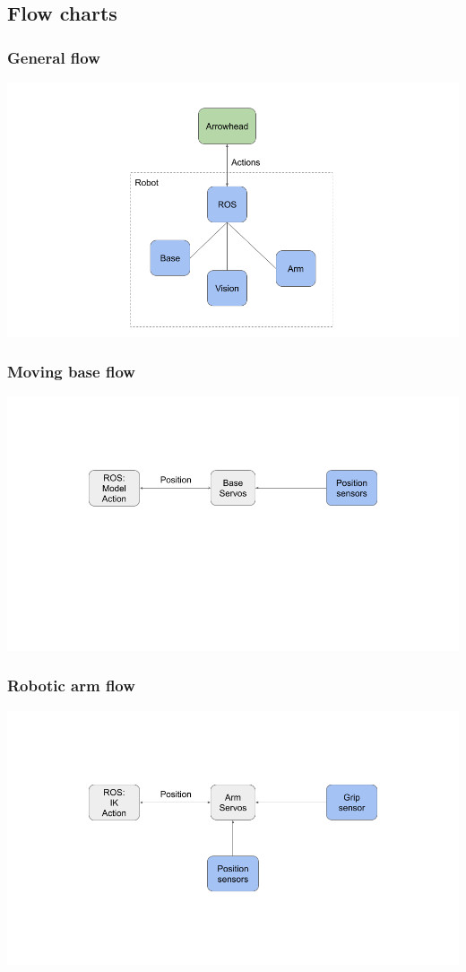 \documentclass{beamer}
\begin{document}
\subsection{Flow charts}
\begin{frame}
    \frametitle{General flow}
    \includegraphics[width=\textwidth]{img/general_flow.png}
\end{frame}

\begin{frame}
    \frametitle{Moving base flow}
    \includegraphics[width=\textwidth]{img/base_flow.png}
\end{frame}

\begin{frame}
    \frametitle{Robotic arm flow}
    \includegraphics[width=\textwidth]{img/arm_flow.png}
\end{frame}
\end{document}
